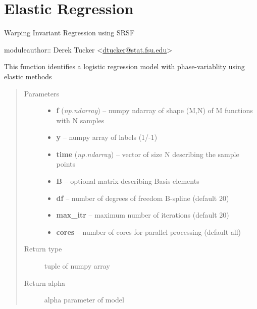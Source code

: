 \documentclass[letterpaper,10pt,english]{sphinxmanual}
\begin{document}
\chapter{Elastic Regression}
\label{regression:elastic-regression}\label{regression:module-regression}\label{regression::doc}
Warping Invariant Regression using SRSF

moduleauthor:: Derek Tucker \textless{}\href{mailto:dtucker@stat.fsu.edu}{dtucker@stat.fsu.edu}\textgreater{}

\begin{fulllineitems}
\label{regression:regression.elastic_logistic}
This function identifies a logistic regression model with
phase-variablity using elastic methods
\begin{quote}\begin{description}
\item[{Parameters}] \leavevmode\begin{itemize}
\item {} 
\textbf{f} (\emph{np.ndarray}) -- numpy ndarray of shape (M,N) of M functions with N samples

\item {} 
\textbf{y} -- numpy array of labels (1/-1)

\item {} 
\textbf{time} (\emph{np.ndarray}) -- vector of size N describing the sample points

\item {} 
\textbf{B} -- optional matrix describing Basis elements

\item {} 
\textbf{df} -- number of degrees of freedom B-spline (default 20)

\item {} 
\textbf{max\_itr} -- maximum number of iterations (default 20)

\item {} 
\textbf{cores} -- number of cores for parallel processing (default all)

\end{itemize}

\item[{Return type}] \leavevmode
tuple of numpy array

\item[{Return alpha}] \leavevmode
alpha parameter of model


\end{description}
\end{quote}
\end{fulllineitems}
\end{document}
